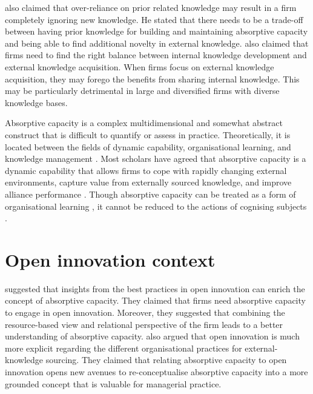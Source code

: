 \citet{lichtenthaler2016absorptive} also claimed that over-reliance on prior related knowledge may result in a firm completely ignoring new knowledge. He stated that there needs to be a trade-off between having prior knowledge for building and maintaining absorptive capacity and being able to find additional novelty in external knowledge. \citet{lichtenthaler2016absorptive} also claimed that firms need to find the right balance between internal knowledge development and external knowledge acquisition. When firms focus on external knowledge acquisition, they may forego the benefits from sharing internal knowledge. This may be particularly detrimental in large and diversified firms with diverse knowledge bases. \medskip 

Absorptive capacity is a complex multidimensional and somewhat abstract construct that is difficult to quantify or assess in practice. Theoretically, it is located between the fields of dynamic capability, organisational learning, and knowledge management \citep{easterby2008absorptive}. Most scholars have agreed that absorptive capacity is a dynamic capability that allows firms to cope with rapidly changing external environments, capture value from externally sourced knowledge, and improve alliance performance \citep{omidvar2013revisiting}. Though absorptive capacity can be treated as a form of organisational learning \citep{cohen1989innovation,easterby2008absorptive,sun2010examination}, it cannot be reduced to the actions of cognising subjects \citep{omidvar2013revisiting,turner2013absorptive,marabelli2014knowing}. \medskip

\section{Open innovation context}

\citet{vanhaverbeke2007connecting} suggested that insights from the best practices in open innovation can enrich the concept of absorptive capacity. They claimed that firms need absorptive capacity to engage in open innovation. Moreover, they suggested that combining the resource-based view \citep{wernerfelt1984resource} and relational perspective of the firm \citep{dyer1998relational} leads to a better understanding of absorptive capacity. \citet{vanhaverbeke2007connecting} also argued that open innovation is much more explicit regarding the different organisational practices for external-knowledge sourcing. They claimed that relating absorptive capacity to open innovation opens new avenues to re-conceptualise absorptive capacity into a more grounded concept that is valuable for managerial practice. \medskip

